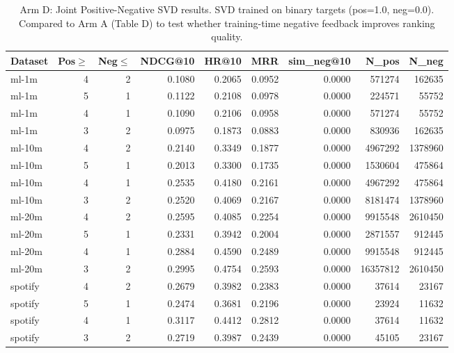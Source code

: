 \begin{table}[ht]
\centering
\caption{Arm D: Joint Positive-Negative SVD results. SVD trained on binary targets (pos=1.0, neg=0.0). Compared to Arm A (Table D) to test whether training-time negative feedback improves ranking quality.}
\begin{tabular}{lrrrrrrrr}
\toprule
Dataset & Pos$\geq$ & Neg$\leq$ & NDCG@10 & HR@10 & MRR & sim\_neg@10 & N\_pos & N\_neg \\
\midrule
ml-1m & 4 & 2 & 0.1080 & 0.2065 & 0.0952 & 0.0000 & 571274 & 162635 \\
ml-1m & 5 & 1 & 0.1122 & 0.2108 & 0.0978 & 0.0000 & 224571 & 55752 \\
ml-1m & 4 & 1 & 0.1090 & 0.2106 & 0.0958 & 0.0000 & 571274 & 55752 \\
ml-1m & 3 & 2 & 0.0975 & 0.1873 & 0.0883 & 0.0000 & 830936 & 162635 \\
ml-10m & 4 & 2 & 0.2140 & 0.3349 & 0.1877 & 0.0000 & 4967292 & 1378960 \\
ml-10m & 5 & 1 & 0.2013 & 0.3300 & 0.1735 & 0.0000 & 1530604 & 475864 \\
ml-10m & 4 & 1 & 0.2535 & 0.4180 & 0.2161 & 0.0000 & 4967292 & 475864 \\
ml-10m & 3 & 2 & 0.2520 & 0.4069 & 0.2167 & 0.0000 & 8181474 & 1378960 \\
ml-20m & 4 & 2 & 0.2595 & 0.4085 & 0.2254 & 0.0000 & 9915548 & 2610450 \\
ml-20m & 5 & 1 & 0.2331 & 0.3942 & 0.2004 & 0.0000 & 2871557 & 912445 \\
ml-20m & 4 & 1 & 0.2884 & 0.4590 & 0.2489 & 0.0000 & 9915548 & 912445 \\
ml-20m & 3 & 2 & 0.2995 & 0.4754 & 0.2593 & 0.0000 & 16357812 & 2610450 \\
spotify & 4 & 2 & 0.2679 & 0.3982 & 0.2383 & 0.0000 & 37614 & 23167 \\
spotify & 5 & 1 & 0.2474 & 0.3681 & 0.2196 & 0.0000 & 23924 & 11632 \\
spotify & 4 & 1 & 0.3117 & 0.4412 & 0.2812 & 0.0000 & 37614 & 11632 \\
spotify & 3 & 2 & 0.2719 & 0.3987 & 0.2439 & 0.0000 & 45105 & 23167 \\
\bottomrule
\end{tabular}
\end{table}
